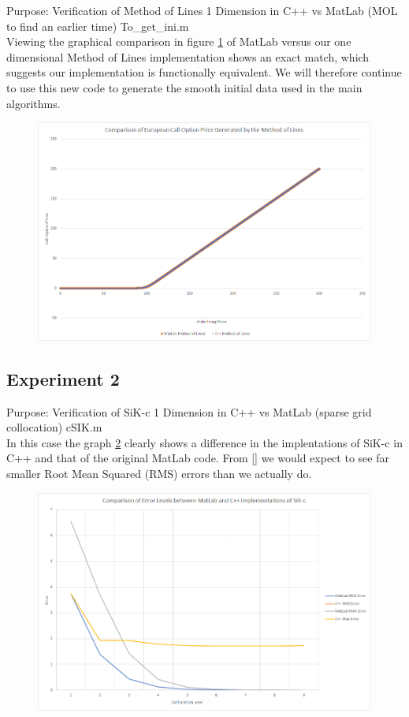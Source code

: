 \documentclass[a4paper]{amsart}
\begin{document}
Purpose: Verification of Method of Lines 1 Dimension in C++ vs MatLab (MOL to find an earlier time) To\_get\_ini.m\\

Viewing the graphical comparison in figure \ref{fig:cppExp1} of MatLab versus our one dimensional Method of Lines implementation shows an exact match, which suggests our implementation is functionally equivalent. We will therefore continue to use this new code to generate the smooth initial data used in the main algorithms.

\begin{figure}[h]
\centering
\includegraphics[scale=0.3]{cppExp1-chart.png}
\caption {}
\label {fig:cppExp1}
\end{figure}

\subsection{Experiment 2}\label{cppExp2}

Purpose: Verification of SiK-c 1 Dimension in C++ vs MatLab (sparse grid collocation) cSIK.m\\

In this case the graph \ref{fig:cppExp2} clearly shows a difference in the implentations of SiK-c in C++ and that of the original MatLab code. From \ref{} we would expect to see far smaller Root Mean Squared (RMS) errors than we actually do.

\begin{figure}[h]
\centering
\includegraphics[scale=0.3]{cppExp2-chart.png}
\caption {}
\label {fig:cppExp2}
\end{figure}
\end{document}
